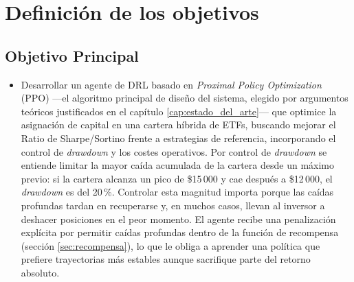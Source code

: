 \documentclass[IB,a4paper]{TFUOC}
\begin{document}
\section{Definición de los objetivos}
\subsection{Objetivo Principal}
\begin{itemize}
    \item Desarrollar un agente de DRL basado en \textit{Proximal Policy Optimization} (PPO) ---el algoritmo principal de diseño del sistema, elegido por argumentos teóricos justificados en el capítulo \ref{cap:estado_del_arte}--- que optimice la asignación de capital en una cartera híbrida de ETFs, buscando mejorar el Ratio de Sharpe/Sortino frente a estrategias de referencia, incorporando el control de \textit{drawdown} y los costes operativos. Por control de \textit{drawdown} se entiende limitar la mayor caída acumulada de la cartera desde un máximo previo: si la cartera alcanza un pico de \$15\,000 y cae después a \$12\,000, el \textit{drawdown} es del 20\,\%. Controlar esta magnitud importa porque las caídas profundas tardan en recuperarse y, en muchos casos, llevan al inversor a deshacer posiciones en el peor momento. El agente recibe una penalización explícita por permitir caídas profundas dentro de la función de recompensa (sección \ref{sec:recompensa}), lo que le obliga a aprender una política que prefiere trayectorias más estables aunque sacrifique parte del retorno absoluto.
\end{itemize}
\end{document}
